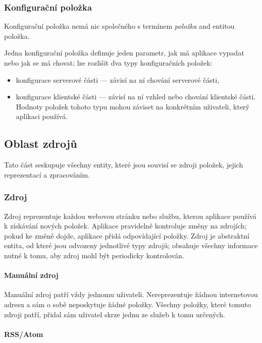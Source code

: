 \subsubsection{Konfigurační položka}

Konfigurační položka nemá nic společného s termínem \textit{položka} and entitou položka.

Jedna konfigurační položka definuje jeden parametr, jak má aplikace vypadat nebo jak se má chovat; lze rozlišit dva typy konfiguračních položek:
\begin{itemize}
	\item konfigurace serverové části --- závisí na ní chování serverové části,
	\item konfigurace klientské části --- závisí na ní vzhled nebo chování klientské části.
		Hodnoty položek tohoto typu mohou záviset na konkrétním uživateli, který aplikaci používá.
\end{itemize}

\subsection{Oblast zdrojů}

Tato část seskupuje všechny entity, které jsou souvisí se zdroji položek, jejich reprezentací a zpracováním.

\subsubsection{Zdroj}

Zdroj reprezentuje každou webovou stránku nebo službu, kterou aplikace používá k získávání nových položek.
Aplikace pravidelně kontroluje změny na zdrojích; pokud ke změně dojde, aplikace přidá odpovídající položky.
Zdroj je abstraktní entita, od které jsou odvozeny jednotlivé typy zdrojů; obsahuje všechny informace nutné k tomu, aby zdroj mohl být periodicky kontrolován.

\paragraph{Manuální zdroj}

Manuální zdroj patří vždy jednomu uživateli.
Nereprezentuje žádnou internetovou adresu a sám o sobě neposkytuje žádné položky.
Všechny položky, které tomuto zdroji patří, přidal sám uživatel skrze jednu ze služeb k tomu určených.

\paragraph{RSS/Atom}

